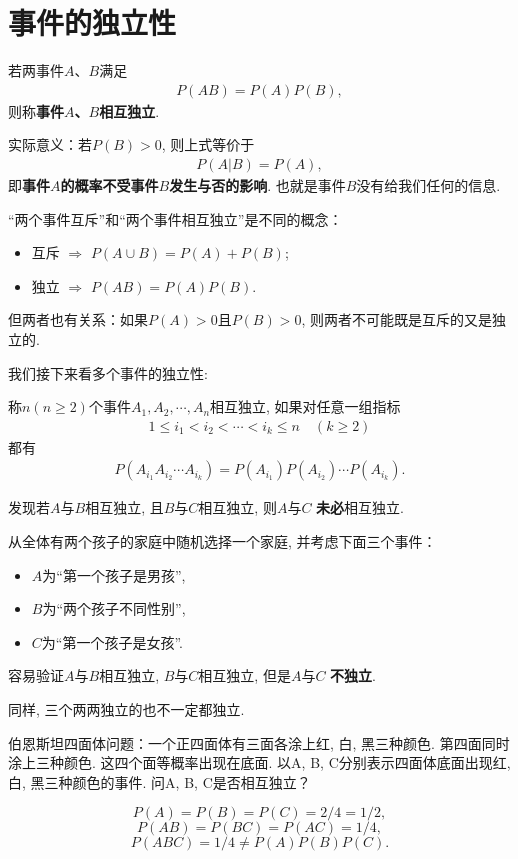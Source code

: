 \section{事件的独立性}

\begin{definition}
    若两事件$A$、$B$满足
    \begin{align*}
        P(AB)= P(A) P(B),
    \end{align*}
    则称\textbf{事件$A$、$B$相互独立}. %
\end{definition}

实际意义：若$P(B)>0$, 则上式等价于
\begin{align*}
    P(A|B)= P(A),
\end{align*}
即\textbf{事件$A$的概率不受事件$B$发生与否的影响}.  也就是事件$B$没有给我们任何的信息.

\begin{remark}
    “两个事件互斥”和“两个事件相互独立”是不同的概念：
    \begin{itemize}
        \item 互斥 $\Rightarrow$ $P(A\cup B)=P(A)+P(B)$; 
        \item 独立 $\Rightarrow$ $P(AB)=P(A)P(B)$. 
    \end{itemize}
    但两者也有关系：如果$P(A)>0$且$P(B)>0$, 则两者不可能既是互斥的又是独立的. 
\end{remark}

我们接下来看多个事件的独立性:

\begin{definition}
    称$n(n\ge 2)$个事件$A_1, A_2, \cdots, A_n$相互独立, 如果对任意一组指标
    \begin{align*}
        1\le i_1<i_2< \cdots <i_k\le n\quad (k\ge 2)
    \end{align*}
    都有
    \begin{align*}
        P(A_{i_1}A_{i_2}\cdots A_{i_k})=P(A_{i_1})P(A_{i_2})\cdots  P(A_{i_k}).
    \end{align*}
\end{definition}

发现若$A$与$B$相互独立, 且$B$与$C$相互独立, 则$A$与$C$ \textbf{未必}相互独立. 
\begin{example}
    从全体有两个孩子的家庭中随机选择一个家庭, 并考虑下面三个事件：
    \begin{itemize}
        \item $A$为“第一个孩子是男孩”, 
        \item $B$为“两个孩子不同性别”, 
        \item $C$为“第一个孩子是女孩”. 
    \end{itemize}
    容易验证$A$与$B$相互独立, $B$与$C$相互独立, 但是$A$与$C$ \textbf{不独立}. 

    同样, 三个两两独立的也不一定都独立.

    伯恩斯坦四面体问题：一个正四面体有三面各涂上红, 白, 黑三种颜色. 第四面同时涂上三种颜色. 这四个面等概率出现在底面. 以A, B, C分别表示四面体底面出现红, 白, 黑三种颜色的事件. 问A, B, C是否相互独立？

    $$
        P(A)=P(B)=P(C)=2/4=1/2,
    $$
    $$
        P(AB)=P(BC)=P(AC)=1/4,
    $$
    $$
        P(ABC)=1/4\neq P(A)P(B)P(C).
    $$
\end{example}


